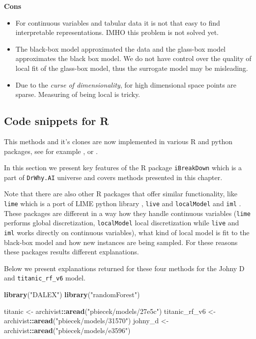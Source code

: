 \documentclass[12pt,]{krantz}
\newenvironment{Shaded}{\begin{snugshade}}{\end{snugshade}}
\newcommand{\KeywordTok}[1]{\textcolor[rgb]{0.13,0.29,0.53}{\textbf{#1}}}
\newcommand{\NormalTok}[1]{#1}
\newcommand{\OperatorTok}[1]{\textcolor[rgb]{0.81,0.36,0.00}{\textbf{#1}}}
\newcommand{\StringTok}[1]{\textcolor[rgb]{0.31,0.60,0.02}{#1}}
\providecommand{\tightlist}{%
  \setlength{\itemsep}{0pt}\setlength{\parskip}{0pt}}
\theoremstyle{definition}
\theoremstyle{definition}
\theoremstyle{definition}
\theoremstyle{remark}
\begin{document}
\textbf{Cons}

\begin{itemize}
\tightlist
\item
  For continuous variables and tabular data it is not that easy to find
  interpretable representations. IMHO this problem is not solved yet.
\item
  The black-box model approximated the data and the glass-box model
  approximates the black box model. We do not have control over the
  quality of local fit of the glass-box model, thus the surrogate model
  may be misleading.
\item
  Due to the \emph{curse of dimensionality}, for high dimensional space
  points are sparse. Measuring of being local is tricky.
\end{itemize}

\hypertarget{code-snippets-for-r-3}{%
\subsection{Code snippets for R}\label{code-snippets-for-r-3}}

This methods and it's clones are now implemented in various R and python
packages, see for example \citep{R-lime}, \citep{R-live} or
\citep{R-iml}.

In this section we present key features of the R package
\texttt{iBreakDown} \citep{iBreakDownRPackage} which is a part of
\texttt{DrWhy.AI} universe and covers methods presented in this chapter.

Note that there are also other R packages that offer similar
functionality, like \texttt{lime} \citep{R-lime} which is a port of LIME
python library \citep{shapPackage}, \texttt{live} \citep{R-live} and
\texttt{localModel} \citep{localModelPackage} and \texttt{iml}
\citep{imlRPackage}. These packages are different in a way how they
handle continuous variables (\texttt{lime} performs global
discretization, \texttt{localModel} local discretization while
\texttt{live} and \texttt{iml} works directly on continuous variables),
what kind of local model is fit to the black-box model and how new
instances are being sampled. For these reasons these packages results
different explanations.

Below we present explanations returned for these four methods for the
Johny D and \texttt{titanic\_rf\_v6} model.

\begin{Shaded}
\begin{Highlighting}[]
\KeywordTok{library}\NormalTok{(}\StringTok{"DALEX"}\NormalTok{)}
\KeywordTok{library}\NormalTok{(}\StringTok{"randomForest"}\NormalTok{)}

\NormalTok{titanic <-}\StringTok{ }\NormalTok{archivist}\OperatorTok{::}\KeywordTok{aread}\NormalTok{(}\StringTok{"pbiecek/models/27e5c"}\NormalTok{)}
\NormalTok{titanic_rf_v6 <-}\StringTok{ }\NormalTok{archivist}\OperatorTok{::}\KeywordTok{aread}\NormalTok{(}\StringTok{"pbiecek/models/31570"}\NormalTok{)}
\NormalTok{johny_d <-}\StringTok{ }\NormalTok{archivist}\OperatorTok{::}\KeywordTok{aread}\NormalTok{(}\StringTok{"pbiecek/models/e3596"}\NormalTok{)}
\end{Highlighting}
\end{Shaded}
\end{document}
